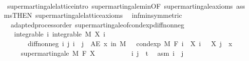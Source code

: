 \begin{isabellebody}
%
\isadelimproof
\ \ %
\endisadelimproof
%
\isatagproof
{}\isamarkupfalse%
\ supermartingale{\isacharunderscore}{\kern0pt}lattice{\isachardot}{\kern0pt}intro\ supermartingale{\isachardot}{\kern0pt}min{\isacharbrackleft}{\kern0pt}OF\ supermartingale{\isacharunderscore}{\kern0pt}axioms\ assms{\isacharbrackleft}{\kern0pt}THEN\ supermartingale{\isacharunderscore}{\kern0pt}lattice{\isachardot}{\kern0pt}axioms{\isacharbrackright}{\kern0pt}{\isacharbrackright}{\kern0pt}\ \isamarkupfalse%
\ inf{\isacharunderscore}{\kern0pt}min{\isacharbrackleft}{\kern0pt}symmetric{\isacharbrackright}{\kern0pt}\ \isacommand{{\isachardot}{\kern0pt}}\isamarkupfalse%
%
\endisatagproof
{\isafoldproof}%
%
\isadelimproof
\isanewline
%
\endisadelimproof
\isanewline
{}\isamarkupfalse%
\ {\isacharparenleft}{\kern0pt}\ adapted{\isacharunderscore}{\kern0pt}process{\isacharunderscore}{\kern0pt}order{\isacharparenright}{\kern0pt}\ supermartingale{\isacharunderscore}{\kern0pt}of{\isacharunderscore}{\kern0pt}cond{\isacharunderscore}{\kern0pt}exp{\isacharunderscore}{\kern0pt}diff{\isacharunderscore}{\kern0pt}nonneg{\isacharcolon}{\kern0pt}\ \isanewline
\ \ \ integrable{\isacharcolon}{\kern0pt}\ {\isachardoublequoteopen}{\isasymAnd}i{\isachardot}{\kern0pt}\ integrable\ M\ {\isacharparenleft}{\kern0pt}X\ i{\isacharparenright}{\kern0pt}{\isachardoublequoteclose}\ \isanewline
\ \ \ \ \ \ \ diff{\isacharunderscore}{\kern0pt}nonneg{\isacharcolon}{\kern0pt}\ {\isachardoublequoteopen}{\isasymAnd}i\ j{\isachardot}{\kern0pt}\ i\ {\isasymle}\ j\ {\isasymLongrightarrow}\ AE\ x\ in\ M{\isachardot}{\kern0pt}\ {}\ {\isasymle}\ cond{\isacharunderscore}{\kern0pt}exp\ M\ {\isacharparenleft}{\kern0pt}F\ i{\isacharparenright}{\kern0pt}\ {\isacharparenleft}{\kern0pt}{\isasymlambda}{\isasymxi}{\isachardot}{\kern0pt}\ X\ i\ {\isasymxi}\ {\isacharminus}{\kern0pt}\ X\ j\ {\isasymxi}{\isacharparenright}{\kern0pt}\ x{\isachardoublequoteclose}\isanewline
\ \ \ \ \ {\isachardoublequoteopen}supermartingale\ M\ F\ X{\isachardoublequoteclose}\isanewline
%
\isadelimproof
%
\endisadelimproof
%
\isatagproof
{}\isamarkupfalse%
\ \isanewline
\ \ \isacommand{{\isacharbraceleft}{\kern0pt}}\isamarkupfalse%
\isanewline
\ \ \ \ \isamarkupfalse%
\ i\ j\ {\isacharcolon}{\kern0pt}{\isacharcolon}{\kern0pt}\ {\isacharprime}{\kern0pt}t\ \isamarkupfalse%
\ asm{\isacharcolon}{\kern0pt}\ {\isachardoublequoteopen}i\ {\isasymle}\ j{\isachardoublequoteclose}\isanewline

\end{isabellebody}
